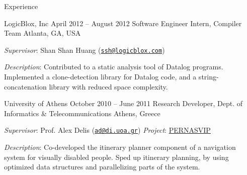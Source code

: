 \documentclass{resume}
\begin{document}
\begin{rSection}{Experience}
\begin{rSubsection}{LogicBlox, Inc}
  {April 2012 -- August 2012}
  {Software Engineer Intern, Compiler Team}
  {Atlanta, GA, USA}
\item \emph{Supervisor}: Shan Shan Huang
  (\href{mailto:ssh@logicblox.com}{\nolinkurl{ssh@logicblox.com}})
\item \emph{Description}: Contributed to a static analysis tool of
  Datalog programs. Implemented a clone-detection library for Datalog
  code, and a string-concatenation library with reduced space complexity.
\end{rSubsection}

\begin{rSubsection}
  {University of Athens}
  {October 2010 -- June 2011}
  {Research Developer, Dept. of Informatics \& Telecommunications}
  {Athens, Greece}
\item \emph{Supervisor}: Prof. Alex Delis
  (\href{mailto:ad@di.uoa.gr}{\nolinkurl{ad@di.uoa.gr}})
  \hfill{%
  \emph{Project}: \href{http://pernasvip.di.uoa.gr/index.php}{PERNASVIP}}
\item \emph{Description}: Co-developed the itinerary planner component
  of a navigation system for visually disabled people. Sped up
  itinerary planning, by using optimized data structures and
  parallelizing parts of the system.
\end{rSubsection}

\end{rSection}
\end{document}
